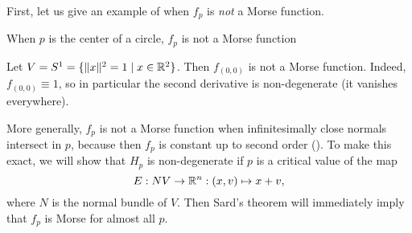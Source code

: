 First, let us give an example of when $f_p$ is \emph{not} a Morse function.

\begin{marginfigure}
    \centering
    \caption{When $p$ is the center of a circle, $f_p$ is not a Morse function}
    \label{fig:example-when-fp-is-not-a-morse-function}
\end{marginfigure}
\begin{eg}
    Let $V = S^1 = \{\|x\|^2 = 1  \mid  x \in \mathbb{R}^2\} $.
    Then $f_{(0, 0)}$ is not a Morse function.
    Indeed, $f_{(0, 0)} \equiv 1$, so in particular the second derivative is non-degenerate (it vanishes everywhere).
\end{eg}


More generally, $f_p$ is not a Morse function when infinitesimally close normals intersect in $p$, because then $f_p$ is constant up to second order ().
To make this exact, we will show that $H_p$ is non-degenerate if $p$ is a critical value of the map
\[
    E: NV \to  \mathbb{R}^{n}: (x, v) \mapsto x + v
,\]
where $N$ is the normal bundle of $V$.
Then Sard's theorem will immediately imply that $f_p$ is Morse for almost all $p$.

\begin{figure}[H]
    \centering
    \label{fig:existence-of-morse-functions-normal-bundle-map}
\end{figure}

